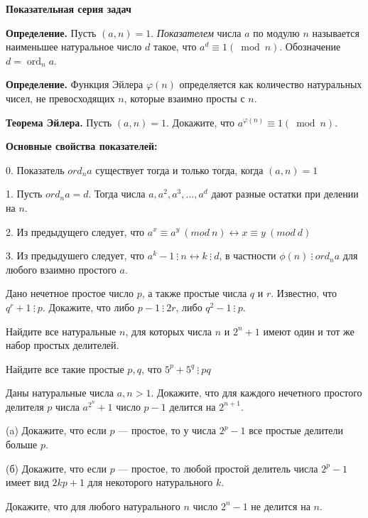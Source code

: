 \centerline{\bf \Huge Показательная серия задач}

\begin{flushright}
        \scriptsize{}
\end{flushright}

\textbf{Определение.} Пусть $(a, n)=1$. \textit{Показателем} числа $a$ по модулю $n$ называется наименьшее натуральное число $d$ такое, что $a^d \equiv 1(\bmod n)$. Обозначение $d=\operatorname{ord}_n a$.

\textbf{Определение.} Функция Эйлера $\varphi(n)$ определяется как количество натуральных чисел, не превосходящих $n$, которые взаимно просты с $n$.

\textbf{Теорема Эйлера.} Пусть $(a, n)=1$. Докажите, что $a^{\varphi(n)} \equiv 1(\bmod n)$.

\textbf{Основные свойства показателей:}

0. Показатель $ord_na$ существует тогда и только тогда, когда $(a,n) = 1$

1. Пусть $ord_n a = d$. Тогда числа $a, a^2, a^3, \ldots, a^d$ дают разные остатки при делении на $n$.

2. Из предыдущего следует, что $a^x \equiv a^y \ (mod \ n) \longleftrightarrow x \equiv y \ (mod \ d)$

3. Из предыдушего следует, что $a^k - 1 \ \vdots \ n \longleftrightarrow k \ \vdots \ d$, в частности $\phi(n) \ \vdots \ ord_na$ для любого взаимно простого $a$.

Дано нечетное простое число $p$, а также простые числа $q$ и $r$. Известно, что $q^r+1 \ \vdots \  p$. Докажите, что либо $p-1 \ \vdots \ 2 r$, либо $q^2-1 \ \vdots \ p$.

Найдите все натуральные $n$, для которых числа $n$ и $2^n + 1$ имеют один и тот же набор простых делителей.

Найдите все такие простые $p,q$, что $5^p + 5^q \ \vdots \ pq$

Даны натуральные числа $a, n>1$. Докажите, что для каждого нечетного простого делителя $p$ числа $a^{2^n}+1$ число $p-1$ делится на $2^{n+1}$.

(a) Докажите, что если $p$ --- простое, то у числа $2^p-1$ все простые делители больше $p$.

\noindent(б) Докажите, что если $p$ --- простое, то любой простой делитель числа $2^p-1$ имеет вид $2kp+1$ для некоторого натурального $k$.

 Докажите, что для любого натурального $n$ число $2^n-1$ не
делится на $n$.

